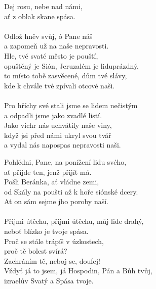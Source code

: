 \begin{translatioMulticol}{2}
Dej rosu, nebe nad námi,\\
ať z oblak skane spása.\\
\\
Odlož hněv svůj, ó Pane náš\\
a zapomeň už na naše nepravosti.\\
Hle, tvé svaté město je pouští,\\
opuštěný je Sión, Jeruzalém je liduprázdný,\\
to místo tobě zasvěcené, dům tvé slávy,\\
kde k chvále tvé zpívali otcové naši.\\
\\
Pro hříchy své stali jsme se lidem nečistým\\
a odpadli jsme jako zvadlé listí.\\
Jako vichr nás uchvátily naše viny,\\
když jsi před námi ukryl svou tvář\\
a vydal nás napospas nepravosti naši.\columnbreak

Pohlédni, Pane, na ponížení lidu svého,\\
ať příjde ten, jenž přijít má.\\
Pošli Beránka, ať vládne zemi,\\
od Skály na poušti až k hoře siónské dcery.\\
Ať on sám sejme jho poroby naší.\\
\\
Přijmi útěchu, přijmi útěchu, můj lide drahý,\\
neboť blízko je tvoje spása.\\
Proč se stále trápíš v úzkostech,\\
proč tě bolest svírá?\\
Zachráním tě, neboj se, doufej!\\
Vždyť já to jsem, já Hospodin, Pán a Bůh tvůj,\\
izraelův Svatý a Spása tvoje.
\end{translatioMulticol}
